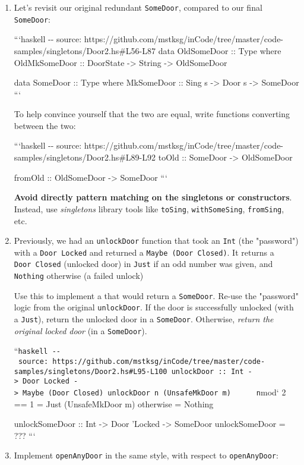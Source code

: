 \documentclass[]{article}
\begin{document}
\begin{enumerate}
\item
  Let's revisit our original redundant \texttt{SomeDoor}, compared to our final
  \texttt{SomeDoor}:

  ```haskell -\/- source:
  https://github.com/mstksg/inCode/tree/master/code-samples/singletons/Door2.hs\#L56-L87
  data OldSomeDoor :: Type where OldMkSomeDoor :: DoorState -\textgreater{}
  String -\textgreater{} OldSomeDoor

  data SomeDoor :: Type where MkSomeDoor :: Sing s -\textgreater{} Door s
  -\textgreater{} SomeDoor ```

  To help convince yourself that the two are equal, write functions converting
  between the two:

  ```haskell -\/- source:
  https://github.com/mstksg/inCode/tree/master/code-samples/singletons/Door2.hs\#L89-L92
  toOld :: SomeDoor -\textgreater{} OldSomeDoor

  fromOld :: OldSomeDoor -\textgreater{} SomeDoor ```

  \textbf{Avoid directly pattern matching on the singletons or constructors}.
  Instead, use \emph{singletons} library tools like \texttt{toSing},
  \texttt{withSomeSing}, \texttt{fromSing}, etc.
\item
  Previously, we had an \texttt{unlockDoor} function that took an \texttt{Int}
  (the "password") with a \texttt{Door\ \textquotesingle{}Locked} and returned a
  \texttt{Maybe\ (Door\ \textquotesingle{}Closed)}. It returns a
  \texttt{Door\ \textquotesingle{}Closed} (unlocked door) in \texttt{Just} if an
  odd number was given, and \texttt{Nothing} otherwise (a failed unlock)

  Use this to implement a that would return a \texttt{SomeDoor}. Re-use the
  "password" logic from the original \texttt{unlockDoor}. If the door is
  successfully unlocked (with a \texttt{Just}), return the unlocked door in a
  \texttt{SomeDoor}. Otherwise, \emph{return the original locked door} (in a
  \texttt{SomeDoor}).

  ``\texttt{haskell\ -\/-\ source:\ https://github.com/mstksg/inCode/tree/master/code-samples/singletons/Door2.hs\#L95-L100\ unlockDoor\ ::\ Int\ -\textgreater{}\ Door\ \textquotesingle{}Locked\ -\textgreater{}\ Maybe\ (Door\ \textquotesingle{}Closed)\ unlockDoor\ n\ (UnsafeMkDoor\ m)\ \ \ \ \ \textbar{}\ n}mod`
  2 == 1 = Just (UnsafeMkDoor m) \textbar{} otherwise = Nothing

  unlockSomeDoor :: Int -\textgreater{} Door 'Locked -\textgreater{} SomeDoor
  unlockSomeDoor = ??? ```
\item
  Implement \texttt{openAnyDoor\textquotesingle{}} in the same style, with
  respect to \texttt{openAnyDoor}:


\end{enumerate}
\end{document}
